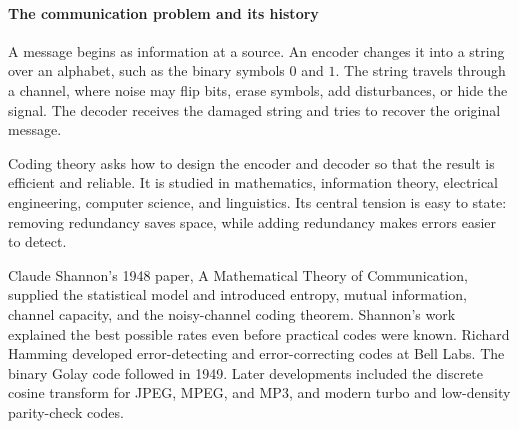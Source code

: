 
\paragraph{The communication problem and its history}

A message begins as information at a source. An encoder changes it into a string over an alphabet, such as the binary symbols $0$ and $1$. The string travels through a channel, where noise may flip bits, erase symbols, add disturbances, or hide the signal. The decoder receives the damaged string and tries to recover the original message.

Coding theory asks how to design the encoder and decoder so that the result is efficient and reliable. It is studied in mathematics, information theory, electrical engineering, computer science, and linguistics. Its central tension is easy to state: removing redundancy saves space, while adding redundancy makes errors easier to detect. \cite{coding_theory_ref1,coding_theory_ref2}

Claude Shannon's 1948 paper, A Mathematical Theory of Communication, supplied the statistical model and introduced entropy, mutual information, channel capacity, and the noisy-channel coding theorem. Shannon's work explained the best possible rates even before practical codes were known. Richard Hamming developed error-detecting and error-correcting codes at Bell Labs. The binary Golay code followed in 1949. Later developments included the discrete cosine transform for JPEG, MPEG, and MP3, and modern turbo and low-density parity-check codes. \cite{coding_theory_ref2,coding_theory_ref3}

